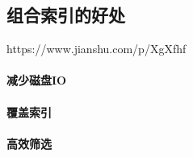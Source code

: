 \documentclass[../../../interview-questions.tex]{subfiles}
\begin{document}
\subsection{组合索引的好处}

https://www.jianshu.com/p/XgXfhf

\paragraph{减少磁盘IO}

\paragraph{覆盖索引}

\paragraph{高效筛选}
\end{document}
